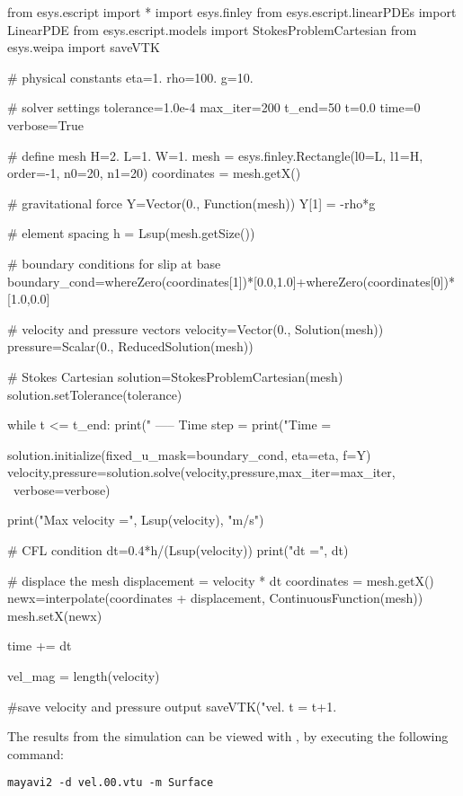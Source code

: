 \begin{python}
  from esys.escript import *
  import esys.finley
  from esys.escript.linearPDEs import LinearPDE
  from esys.escript.models import StokesProblemCartesian
  from esys.weipa import saveVTK

  # physical constants
  eta=1.
  rho=100.
  g=10.

  # solver settings
  tolerance=1.0e-4
  max_iter=200
  t_end=50
  t=0.0
  time=0
  verbose=True

  # define mesh
  H=2.
  L=1.
  W=1.
  mesh = esys.finley.Rectangle(l0=L, l1=H, order=-1, n0=20, n1=20)
  coordinates = mesh.getX()

  # gravitational force
  Y=Vector(0., Function(mesh))
  Y[1] = -rho*g

  # element spacing
  h = Lsup(mesh.getSize())

  # boundary conditions for slip at base
  boundary_cond=whereZero(coordinates[1])*[0.0,1.0]+whereZero(coordinates[0])*[1.0,0.0]

  # velocity and pressure vectors
  velocity=Vector(0., Solution(mesh))
  pressure=Scalar(0., ReducedSolution(mesh))

  # Stokes Cartesian
  solution=StokesProblemCartesian(mesh)
  solution.setTolerance(tolerance)

  while t <= t_end:
    print(" ----- Time step = %
    print("Time = %

    solution.initialize(fixed_u_mask=boundary_cond, eta=eta, f=Y)
    velocity,pressure=solution.solve(velocity,pressure,max_iter=max_iter, \
                                     verbose=verbose)

    print("Max velocity =", Lsup(velocity), "m/s")

    # CFL condition
    dt=0.4*h/(Lsup(velocity))
    print("dt =", dt)

    # displace the mesh
    displacement = velocity * dt
    coordinates = mesh.getX()
    newx=interpolate(coordinates + displacement, ContinuousFunction(mesh))
    mesh.setX(newx)

    time += dt

    vel_mag = length(velocity)

    #save velocity and pressure output
    saveVTK("vel.%
    t = t+1.
\end{python}
%
The results from the simulation can be viewed with \mayavi, by executing the
following command:
\begin{verbatim}
mayavi2 -d vel.00.vtu -m Surface
\end{verbatim}
